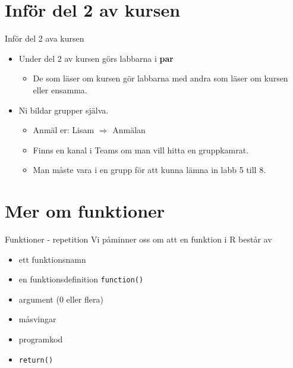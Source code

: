 \documentclass[
  11pt,
  ignorenonframetext,
]{beamer}
\providecommand{\tightlist}{%
  \setlength{\itemsep}{0pt}\setlength{\parskip}{0pt}}
\begin{document}
\hypertarget{infuxf6r-del-2-av-kursen}{%
\section{Inför del 2 av kursen}\label{infuxf6r-del-2-av-kursen}}

\begin{frame}{Inför del 2 ava kursen}
\protect\hypertarget{infuxf6r-del-2-ava-kursen}{}
\begin{itemize}
\tightlist
\item
  Under del 2 av kursen görs labbarna i \textbf{par}

  \begin{itemize}
  \tightlist
  \item
    De som läser om kursen gör labbarna med andra som läser om kursen
    eller ensamma.
  \end{itemize}
\item
  Ni bildar grupper själva.

  \begin{itemize}
  \tightlist
  \item
    Anmäl er: Lisam $\Rightarrow$ Anmälan
  \item
    Finns en kanal i Teams om man vill hitta en gruppkamrat.
  \item
    Man måste vara i en grupp för att kunna lämna in labb 5 till 8.
  \end{itemize}
\end{itemize}
\end{frame}

\hypertarget{mer-om-funktioner}{%
\section{Mer om funktioner}\label{mer-om-funktioner}}

\begin{frame}{Funktioner - repetition}
\protect\hypertarget{funktioner---repetition}{}
Vi påminner oss om att en funktion i R består av

\begin{itemize}
\tightlist
\item
  ett funktionsnamn
\item
  en funktionsdefinition \texttt{function()}
\item
  argument (0 eller flera)
\item
  måsvingar
\item
  programkod
\item
  \texttt{return()}
\end{itemize}
\end{frame}
\end{document}
